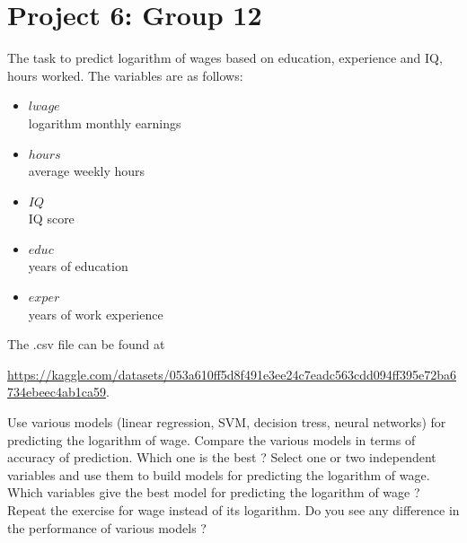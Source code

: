\documentclass{article}
\begin{document}
\section*{Project 6: Group 12}
   The task to predict logarithm of wages based on education, experience and IQ, hours worked. The variables are as follows:
   \begin{itemize}
   \item{$lwage$ \\}                    logarithm monthly earnings
   \item{$hours$ \\}                    average weekly hours
   \item{$IQ$ \\}                      IQ score
   \item{$educ$ \\}                     years of education
   \item{$exper$ \\}                    years of work experience
   \end{itemize}

   The .csv file can be found at  

   \url{https://kaggle.com/datasets/053a610ff5d8f491e3ee24c7eadc563cdd094ff395e72ba6734ebeec4ab1ca59}.
  
  Use various models (linear regression, SVM, decision tress, neural networks) for predicting the logarithm of wage. Compare the various models in terms of accuracy of prediction. Which one is the best ? 
   Select one or two independent variables  and use them to build models for predicting the logarithm of wage.
  Which variables give the best model for predicting  the logarithm of wage  ? Repeat the exercise for wage instead of its logarithm. Do you see any difference in the performance of various models ? 
   
\end{document}
